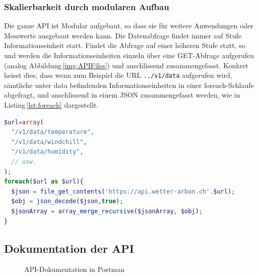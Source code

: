 \subsubsection{Skalierbarkeit durch modularen Aufbau}
Die ganze API ist Modular aufgebaut, so dass sie für weitere Anwendungen oder Messwerte ausgebaut werden kann. Die Datenabfrage findet immer auf Stufe Informationseinheit statt. Findet die Abfrage auf einer höheren Stufe statt, so und werden die Informationseinheiten einzeln über eine GET-Abfrage aufgerufen (analog Abbildung\,\ref{img:APIFiles}) und anschlissend zusammengefasst. Konkret heisst dies, dass wenn zum Beispiel die URL \texttt{../v1/data} aufgerufen wird, sämtliche unter data befindenden Informationseinheiten in einer foreach-Schlaufe abgefragt, und anschlissend in einem JSON zusammengefasst werden, wie in Listing\,\ref{lst:foreach} dargestellt.

\vspace{3mm}
\begin{lstlisting}[label=lst:foreach,caption=API-Abfrage auf Stufe Kategorie, language=php, style=php]
$url=array(
  "/v1/data/temperature",
  "/v1/data/windchill",
  "/v1/data/humidity",
  // usw.
);
foreach($url as $url){
  $json = file_get_contents('https://api.wetter-arbon.ch'.$url);
  $obj = json_decode($json,true);
  $jsonArray = array_merge_recursive($jsonArray, $obj);
}
\end{lstlisting}
\vspace{3mm}



\subsection{Dokumentation der API}

\begin{figure}[htb!]
	\centering
	\caption{API-Dokumentation in Postman}
	\label{img:postman}
\end{figure}

